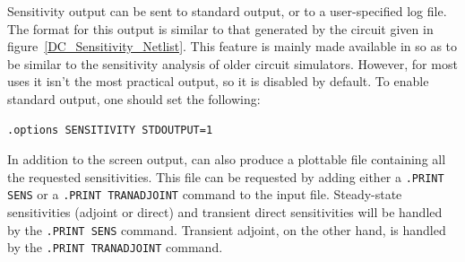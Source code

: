 Sensitivity output can be sent to standard output, or to a
user-specified log file.  The format for this output is similar to
that generated by the circuit given in
figure~\ref{DC_Sensitivity_Netlist}.  This feature is mainly made
available in \Xyce{} so as to be similar to the sensitivity analysis
of older circuit simulators.  However, for most uses it isn't the most
practical output, so it is disabled by default.  To enable standard
output, one should set the following:
\begin{verbatim}
.options SENSITIVITY STDOUTPUT=1
\end{verbatim}

In addition to the screen output, \Xyce{} can also produce a plottable
file containing all the requested sensitivities.  This file can be
requested by adding either a \texttt{.PRINT SENS} or a \texttt{.PRINT
  TRANADJOINT} command to the input file.  Steady-state sensitivities
(adjoint or direct) and transient direct sensitivities will be handled
by the \texttt{.PRINT SENS} command.  Transient adjoint, on the other
hand, is handled by the \texttt{.PRINT TRANADJOINT} command.

